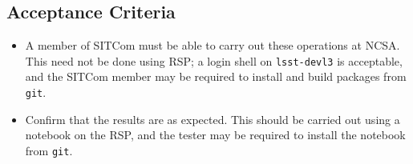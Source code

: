 \subsection{Acceptance Criteria}
\begin{itemize}
\item A member of SITCom must be able to carry out these operations at NCSA.
  This need not be done using RSP; a login shell on \eg \texttt{lsst-devl3} is acceptable, and
  the SITCom member may be required to install and build packages from \texttt{git}.
\item Confirm that the results are as expected.  This should be carried out using a notebook on the RSP,
  and the tester may be required to install the notebook from \texttt{git}.
\end{itemize}
